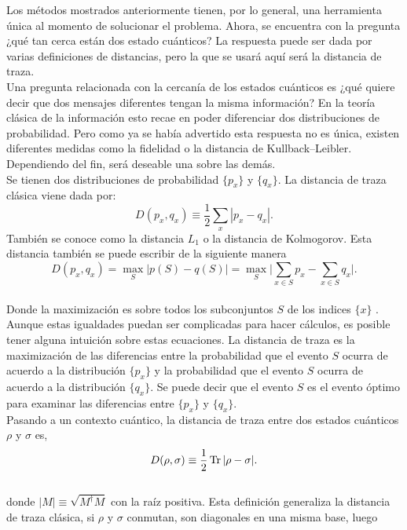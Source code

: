 Los métodos mostrados anteriormente tienen, por lo general, una herramienta única al momento de solucionar el problema. Ahora, se encuentra con la pregunta ¿qué tan cerca están dos estado cuánticos? La respuesta puede ser dada por varias definiciones de distancias, pero la que se usará aquí será la distancia de traza.
\\
Una pregunta relacionada con la cercanía de los estados cuánticos es ¿qué quiere decir que dos mensajes diferentes tengan la misma información? En la teoría clásica de la información esto recae en poder diferenciar dos distribuciones de probabilidad. Pero como ya se había advertido esta respuesta no es única, existen diferentes medidas como la fidelidad o la distancia de Kullback–Leibler. Dependiendo del fin, será deseable una sobre las demás.
\\
Se tienen dos distribuciones de probabilidad $\{ p_{x} \}$ y $\{ q_{x} \}$. La distancia de traza clásica viene dada por:
\begin{equation}
D(p_{x},q_{x})\equiv \frac{1}{2} \sum_{x}|p_{x}-q_{x}|.
\end{equation}
También se conoce como la distancia $L_{1}$ o la distancia de Kolmogorov. Esta distancia también se puede escribir de la siguiente manera 
\begin{equation}
D(p_{x},q_{x})= \max_{S} \big| p(S)-q(S) \big| = \max_{S} \Bigg| \sum_{x \in S}p_{x}-\sum_{x \in S}q_{x} \Bigg|.
\end{equation}
\\
Donde la maximización es sobre todos los subconjuntos $S$ de los indices $\{ x \}$ \cite{NielsenInformation}. Aunque estas igualdades puedan ser complicadas para hacer cálculos, es posible tener alguna intuición sobre estas ecuaciones. La distancia de traza es la maximización de las diferencias entre la probabilidad que el evento $S$ ocurra de acuerdo a la distribución $\{p_{x} \}$ y la probabilidad que el evento $S$ ocurra de acuerdo a la distribución $\{q_{x} \}$. Se puede decir que el evento $S$ es el evento óptimo para examinar las diferencias entre $\{p_{x} \}$ y $\{q_{x} \}$.
\\
Pasando a un contexto cuántico, la distancia de traza entre dos estados cuánticos $\rho$ y $\sigma$ es,
\begin{equation}
D(\rho,\sigma) \equiv \frac{1}{2} \Tr |\rho-\sigma|.	
\end{equation}
\\
donde $|M| \equiv \sqrt{M^{\dagger}M}$ con la raíz positiva. Esta definición generaliza la distancia de traza clásica, si $\rho$ y $\sigma$ conmutan, son diagonales en una misma base, luego
